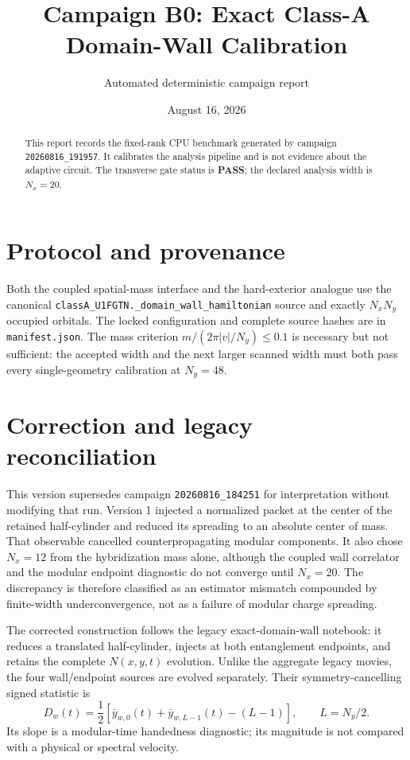 \documentclass[aps,prb,onecolumn,nofootinbib,superscriptaddress]{revtex4-2}
\begin{document}
\title{Campaign B0: Exact Class-A Domain-Wall Calibration}
\author{Automated deterministic campaign report}
\date{August 16, 2026}
\begin{abstract}
This report records the fixed-rank CPU benchmark generated by campaign
\texttt{20260816\_191957}.  It calibrates the analysis pipeline and is
not evidence about the adaptive circuit.  The transverse gate status is \textbf{PASS};
the declared analysis width is $N_x=20$.
\end{abstract}
\maketitle
\tableofcontents
\section{Protocol and provenance}
Both the coupled spatial-mass interface and the hard-exterior analogue use the canonical
\texttt{classA\_U1FGTN.\_domain\_wall\_hamiltonian} source and exactly $N_xN_y$
occupied orbitals.  The locked configuration and complete source hashes are in
\texttt{manifest.json}.  The mass criterion
$m/(2\pi|v|/N_y)\leq 0.1$ is necessary but not sufficient:
the accepted width and the next larger scanned width must both pass every single-geometry
calibration at $N_y=48$.

\section{Correction and legacy reconciliation}
This version supersedes campaign \texttt{20260816\_184251}
for interpretation without modifying that run.  Version 1 injected a normalized packet at
the center of the retained half-cylinder and reduced its spreading to an absolute center
of mass.  That observable cancelled counterpropagating modular components.  It also chose
$N_x=12$ from the hybridization mass alone, although the coupled wall correlator and the
modular endpoint diagnostic do not converge until $N_x=20$.  The discrepancy is therefore
classified as an estimator mismatch compounded by finite-width underconvergence, not as a
failure of modular charge spreading.

The corrected construction follows the legacy exact-domain-wall notebook: it reduces a
translated half-cylinder, injects at both entanglement endpoints, and retains the complete
$N(x,y,t)$ evolution.  Unlike the aggregate legacy movies, the four wall/endpoint sources
are evolved separately.  Their symmetry-cancelling signed statistic is
\begin{equation}
D_w(t)=\frac12\left[\bar y_{w,0}(t)+\bar y_{w,L-1}(t)-(L-1)\right],\qquad L=N_y/2.
\end{equation}
Its slope is a modular-time handedness diagnostic; its magnitude is not compared with a
physical or spectral velocity.
\end{document}
